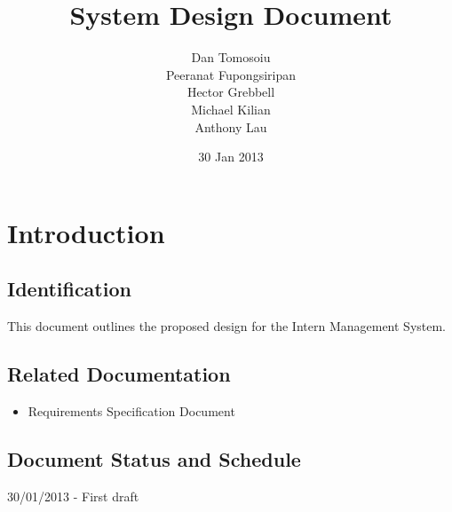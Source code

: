 \documentclass{l3deliverable}
\title{System Design Document}
\author{
  Dan Tomosoiu \\
  Peeranat Fupongsiripan \\
  Hector Grebbell \\
  Michael Kilian \\
  Anthony Lau \\
}
\date{30 Jan 2013}
\begin{document}

\maketitle


\section{Introduction}

\subsection{Identification}
This document outlines the proposed design for the Intern Management System. 
\subsection{Related Documentation}
\begin{itemize}
\item{Requirements Specification Document}
\end{itemize}
 

\subsection{Document Status and Schedule}
30/01/2013 - First draft 
\end{document}
